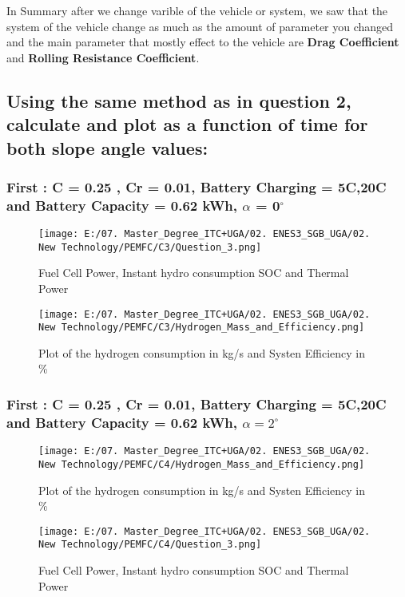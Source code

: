 \documentclass[12pt,a4paper]{article}
\numberwithin{equation}{section}
\begin{document}
In Summary after we change varible of the vehicle or system, we saw that the system of the vehicle change as much as the amount of parameter you changed and the main parameter that mostly effect to the vehicle are \textbf{Drag Coefficient} and \textbf{Rolling Resistance Coefficient}.


\subsection{Using the same method as in question 2, calculate and plot as a function of time for both slope 
	angle values:}


\subsubsection{First : C = 0.25 , Cr = 0.01, Battery Charging = 5C,20C and Battery Capacity = 0.62 kWh, $\alpha$ = 0$^{\circ}$}

\begin{figure}[h]
	\centering 
	\texttt{[image: E:/07. Master\_Degree\_ITC+UGA/02. ENES3\_SGB\_UGA/02. New Technology/PEMFC/C3/Question\_3.png]}
	\caption{\small {Fuel Cell Power, Instant hydro consumption SOC and Thermal Power}}
	\label{25}
\end{figure}
\begin{figure}[h]
	\centering 
	\texttt{[image: E:/07. Master\_Degree\_ITC+UGA/02. ENES3\_SGB\_UGA/02. New Technology/PEMFC/C3/Hydrogen\_Mass\_and\_Efficiency.png]}
	\caption{\small {Plot of the hydrogen consumption in kg/s and Systen Efficiency in \%}}
	\label{26}
\end{figure}



\subsubsection{First : C = 0.25 , Cr = 0.01, Battery Charging = 5C,20C and Battery Capacity = 0.62 kWh, $\alpha = 2^{\circ}$}
\begin{figure}[h]
	\centering 
	\texttt{[image: E:/07. Master\_Degree\_ITC+UGA/02. ENES3\_SGB\_UGA/02. New Technology/PEMFC/C4/Hydrogen\_Mass\_and\_Efficiency.png]}
	\caption{\small {Plot of the hydrogen consumption in kg/s and Systen Efficiency in \%}}
	\label{28}
\end{figure}
\newpage
\begin{figure}[h]
	\centering 
	\texttt{[image: E:/07. Master\_Degree\_ITC+UGA/02. ENES3\_SGB\_UGA/02. New Technology/PEMFC/C4/Question\_3.png]}
	\caption{\small {Fuel Cell Power, Instant hydro consumption SOC and Thermal Power}}
	\label{27}
\end{figure}
\end{document}
